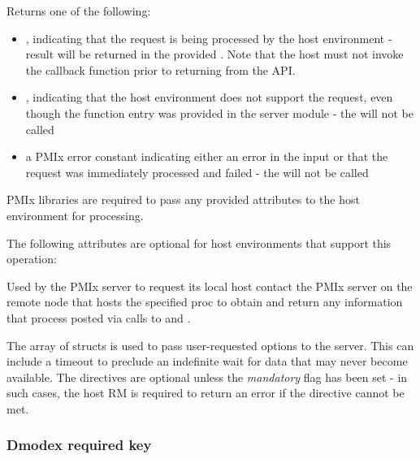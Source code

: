 Returns one of the following:

\begin{itemize}
    \item {}, indicating that the request is being processed by the host environment - result will be returned in the provided . Note that the host must not invoke the callback function prior to returning from the \ac{API}.
    \item {}, indicating that the host environment does not support the request, even though the function entry was provided in the server module - the  will not be called
    \item a PMIx error constant indicating either an error in the input or that the request was immediately processed and failed - the  will not be called
\end{itemize}

\reqattrstart
\ac{PMIx} libraries are required to pass any provided attributes to the host environment for processing.
\reqattrend

\optattrstart
The following attributes are optional for host environments that support this operation:


\optattrend

\descr

Used by the \ac{PMIx} server to request its local host contact the \ac{PMIx} server on the remote node that hosts the specified proc to obtain and return any information that process posted via calls to  and .

The array of  structs is used to pass user-requested options to the server.
This can include a timeout to preclude an indefinite wait for data that may never become available.
The directives are optional unless the \emph{mandatory} flag has been set - in such cases, the host \ac{RM} is required to return an error if the directive cannot be met.


\subsubsection{Dmodex required key}

%


\subsection{}

